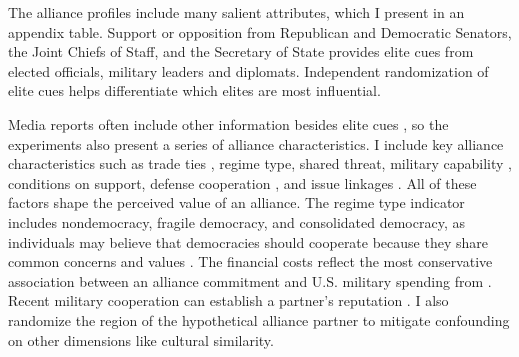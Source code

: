 \documentclass[12pt]{article}
\begin{document}
%                    
%                                                                            


The alliance profiles include many salient attributes, which I present in an appendix table. 
Support or opposition from Republican and Democratic Senators, the Joint Chiefs of Staff, and the Secretary of State provides elite cues from elected officials, military leaders and diplomats. 
Independent randomization of elite cues helps differentiate which elites are most influential.


Media reports often include other information besides elite cues \citep{BaumPotter2008}, so the experiments also present a series of alliance characteristics. 
I include key alliance characteristics such as trade ties \citep{Fordham2010}, regime type, shared threat, military capability \citep{Johnsonetal2015}, conditions on support, defense cooperation \citep{Morrow1994, LeedsAnac2005}, and issue linkages \citep{Poast2012}.
All of these factors shape the perceived value of an alliance. 
The regime type indicator includes nondemocracy, fragile democracy, and consolidated democracy, as individuals may believe that democracies should cooperate because they share common concerns and values \citep{Chuetal2021}. 
The financial costs reflect the most conservative association between an alliance commitment and U.S. military spending from \citet{AlleyFuhrmann2021}. 
Recent military cooperation can establish a partner's reputation \citep{Crescenzietal2012, GannonKent2020}.
I also randomize the region of the hypothetical alliance partner to mitigate confounding on other dimensions like cultural similarity.
\end{document}
